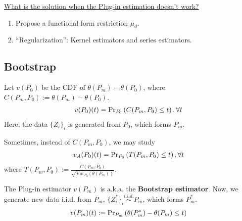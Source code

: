 \documentclass[11pt]{elegantbook}
\begin{document}
\underline{What is the solution when the Plug-in estimation doesn't work?}
\begin{enumerate}
    \item Propose a functional form restriction $\mu_d$.
    \item ``Regularization'': Kernel estimators and series estimators.
\end{enumerate}


\subsection{Bootstrap}
Let $v(P_0)\text{ be the CDF of }\theta(P_m)-\theta(P_0)$, where $C(P_m,P_0):=\theta(P_m)-\theta(P_0)$.
\begin{equation}
    \begin{aligned}
        v(P_0)(t)=\textnormal{Pr}_{P_0}\left(C(P_m,P_0)\leq t\right),\forall t
    \end{aligned}
    \nonumber
\end{equation}
Here, the data $\{Z_i\}_i$ is generated from $P_0$, which forms $P_m$.

\begin{remark}
    Sometimes, instead of $C(P_m,P_0)$, we may study
    \begin{equation}
        \begin{aligned}
            v_A(P_0)(t)=\textnormal{Pr}_{P_0}\left(T(P_m,P_0)\leq t\right), \forall t
        \end{aligned}
        \nonumber
    \end{equation}
    where $T(P_m,P_0):=\frac{C(P_m,P_0)}{\sqrt{\text{Var}_{P_0}(\theta(P_m))}}$.
\end{remark}

\begin{definition}
    \normalfont
    The Plug-in estimator $v(P_m)$ is a.k.a. the \textbf{Bootstrap estimator}. Now, we generate new data i.i.d. from $P_m$, $\{Z_i^*\}_i \stackrel{i.i.d.}{\sim} P_m$, which forms $P_m^*$.
    \begin{equation}
        \begin{aligned}
            v(P_m)(t):=\textnormal{Pr}_{P_m}\left(\theta(P_m^*)-\theta(P_m)\leq t\right)
        \end{aligned}
        \nonumber
    \end{equation}
\end{definition}
\end{document}
